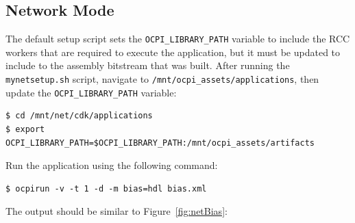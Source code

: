 \subsection{Network Mode}
The default setup script sets the \texttt{OCPI\_LIBRARY\_PATH} variable to include the RCC workers that are required to execute the application, but it must be updated to include to the assembly bitstream that was built.  After running the \texttt{mynetsetup.sh} script, navigate to  \texttt{/mnt/ocpi\_assets/applications}, then update the \texttt{OCPI\_LIBRARY\_PATH} variable:
\begin{verbatim}
$ cd /mnt/net/cdk/applications
$ export OCPI_LIBRARY_PATH=$OCPI_LIBRARY_PATH:/mnt/ocpi_assets/artifacts
\end{verbatim}
Run the application using the following command:
\begin{verbatim}
$ ocpirun -v -t 1 -d -m bias=hdl bias.xml
\end{verbatim}
The output should be similar to Figure~\ref{fig:netBias}:
